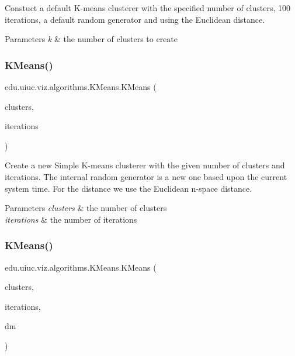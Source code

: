 Constuct a default K-\/means clusterer with the specified number of clusters, 100 iterations, a default random generator and using the Euclidean distance.


\begin{DoxyParams}{Parameters}
{\em k} & the number of clusters to create \\
\hline
\end{DoxyParams}
\mbox{\label{classedu_1_1uiuc_1_1viz_1_1algorithms_1_1_k_means_aedc5f4ee20c7b193c89089a5ac0c2183}} 
\subsubsection{\texorpdfstring{KMeans()}{KMeans()}\hspace{0.1cm}{\footnotesize\ttfamily [3/4]}}
{\footnotesize\ttfamily edu.\+uiuc.\+viz.\+algorithms.\+K\+Means.\+K\+Means (\begin{DoxyParamCaption}\item[{int}]{clusters,  }\item[{int}]{iterations }\end{DoxyParamCaption})}

Create a new Simple K-\/means clusterer with the given number of clusters and iterations. The internal random generator is a new one based upon the current system time. For the distance we use the Euclidean n-\/space distance.


\begin{DoxyParams}{Parameters}
{\em clusters} & the number of clusters \\
\hline
{\em iterations} & the number of iterations \\
\hline
\end{DoxyParams}
\mbox{\label{classedu_1_1uiuc_1_1viz_1_1algorithms_1_1_k_means_ade4c170f802b8593cd82f089a7905cc8}} 
\subsubsection{\texorpdfstring{KMeans()}{KMeans()}\hspace{0.1cm}{\footnotesize\ttfamily [4/4]}}
{\footnotesize\ttfamily edu.\+uiuc.\+viz.\+algorithms.\+K\+Means.\+K\+Means (\begin{DoxyParamCaption}\item[{int}]{clusters,  }\item[{int}]{iterations,  }\item[{Distance\+Measure}]{dm }\end{DoxyParamCaption})}

